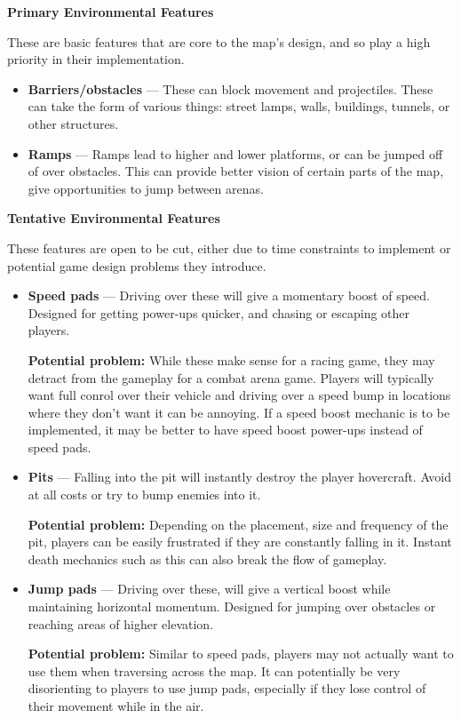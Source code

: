 \documentclass{article}
\theoremstyle{definition}
\begin{document}
\textbf{Primary Environmental Features}

These are basic features that are core to the map's design, and so play a high
priority  in their implementation.

\begin{itemize}
  \item \textbf{Barriers/obstacles} --- These can block movement and
    projectiles. These can take the form of various things: street lamps,
    walls, buildings, tunnels, or other structures.
  \item \textbf{Ramps} --- Ramps lead to higher and lower platforms, or can be jumped
    off of over obstacles. This can provide better vision of certain parts of
    the map, give opportunities to jump between arenas.
\end{itemize}

\textbf{Tentative Environmental Features}

These features are open to be cut, either due to time constraints to implement
or potential game design problems they introduce.

\begin{itemize}
  \item \textbf{Speed pads} --- Driving over these will give a momentary boost of
    speed. Designed for getting power-ups quicker, and chasing or escaping
    other players.

    \textbf{Potential problem:} While these make sense for a racing game, they
    may detract from the gameplay for a combat arena game. Players will
    typically want full conrol over their vehicle and driving over a speed bump
    in locations where they don't want it can be annoying. If a speed boost
    mechanic is to be implemented, it may be better to have speed boost
    power-ups instead of speed pads.
  \item \textbf{Pits} --- Falling into the pit will instantly destroy the player
    hovercraft. Avoid at all costs or try to bump enemies into it.

    \textbf{Potential problem:} Depending on the placement, size and frequency
    of the pit, players can be easily frustrated if they are constantly
    falling in it. Instant death mechanics such as this can also break the flow
    of gameplay.
  \item \textbf{Jump pads} --- Driving over these, will give a vertical boost
    while maintaining horizontal momentum. Designed for jumping over obstacles
    or reaching areas of higher elevation.

    \textbf{Potential problem:} Similar to speed pads, players may not
    actually want to use them when traversing across the map. It can
    potentially be very disorienting to players to use jump pads, especially if
    they lose control of their movement while in the air.
\end{itemize}
\end{document}
